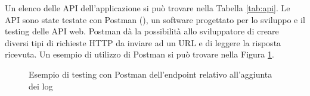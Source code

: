\documentclass[12pt]{report}
\begin{document}
Un elenco delle API dell'applicazione si può trovare nella Tabella \ref{tab:api}.
Le API sono state testate con Postman (\cite{postman}), un software progettato per lo sviluppo e il testing delle API web. Postman dà la possibilità allo sviluppatore di creare diversi tipi di richieste HTTP da inviare ad un URL e di leggere la risposta ricevuta. Un esempio di utilizzo di Postman si può trovare nella Figura \ref{fig:postman_test}.

\begin{figure}[H]
	\caption{Esempio di testing con Postman dell'endpoint relativo all'aggiunta dei log}
	\label{fig:postman_test}
\end{figure}

\pagebreak
\end{document}
